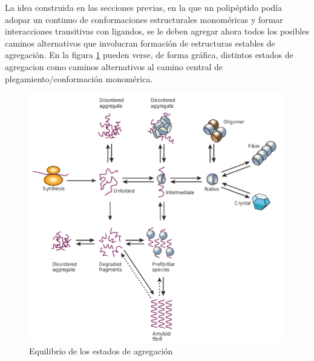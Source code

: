 % 


La idea construida en las secciones previas, en la que un polipéptido podía adopar un continuo de conformaciones estructurales monoméricas y formar interacciones transitivas con ligandos,
se le deben agregar ahora todos los posibles caminos alternativos que involucran formación de estructuras estables de agregación.
En la figura \ref{aggregationDiagram} pueden verse, de forma gráfica, distintos estados de agregacion como caminos alternativos al camino central de plegamiento/conformación monomérica.

\begin{figure}[h!,centered]
\includegraphics[width=\textwidth]{img/aggregationDiagram.png} 
\caption{Equilibrio de los estados de agregación} \label{aggregationDiagram}
\end{figure}



